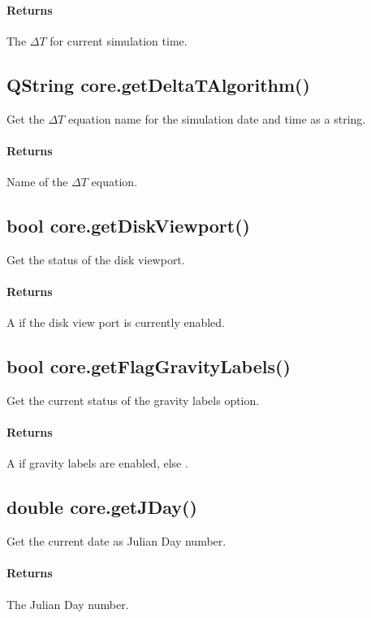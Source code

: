 \paragraph{Returns}
The $\Delta T$ for current simulation time.

\subsection{QString core.getDeltaTAlgorithm()}
\label{sec:ScriptingAPI:core:getDeltaTAlgorithm}
Get the $\Delta T$ equation name for the simulation date and time as a string.

\paragraph{Returns}
Name of the $\Delta T$ equation.

\subsection{bool core.getDiskViewport()}
\label{sec:ScriptingAPI:core:getDiskViewport}
Get the status of the disk viewport.

\paragraph{Returns}
A  if the disk view port is currently enabled.

\subsection{bool core.getFlagGravityLabels()}
\label{sec:ScriptingAPI:core:getFlagGravityLabels}
Get the current status of the gravity labels option.

\paragraph{Returns}
A  if gravity labels are enabled, else .

\subsection{double core.getJDay()}
\label{sec:ScriptingAPI:core:getJDay}
Get the current date as Julian Day number.

\paragraph{Returns}
The Julian Day number.

